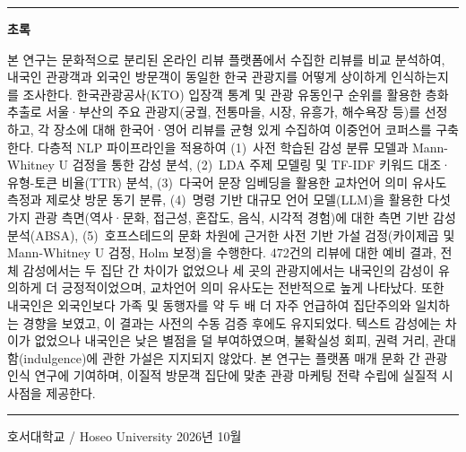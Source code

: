 \documentclass[10pt,a4paper]{article}
\begin{document}
\vspace{8pt}
\noindent\rule{\linewidth}{0.4pt}
\vspace{4pt}

\noindent\textbf{초록}

\vspace{2pt}

\noindent
본 연구는 문화적으로 분리된 온라인 리뷰 플랫폼에서 수집한 리뷰를 비교 분석하여,
내국인 관광객과 외국인 방문객이 동일한 한국 관광지를 어떻게 상이하게 인식하는지를
조사한다. 한국관광공사(KTO) 입장객 통계 및 관광 유동인구 순위를 활용한 층화
추출로 서울·부산의 주요 관광지(궁궐, 전통마을, 시장, 유흥가, 해수욕장 등)를
선정하고, 각 장소에 대해 한국어·영어 리뷰를 균형 있게 수집하여 이중언어
코퍼스를 구축한다. 다층적 NLP 파이프라인을 적용하여 (1)~사전 학습된 감성 분류
모델과 Mann-Whitney U 검정을 통한 감성 분석, (2)~LDA 주제 모델링 및 TF-IDF
키워드 대조·유형-토큰 비율(TTR) 분석, (3)~다국어 문장 임베딩을 활용한
교차언어 의미 유사도 측정과 제로샷 방문 동기 분류, (4)~명령 기반 대규모
언어 모델(LLM)을 활용한 다섯 가지 관광 측면(역사·문화, 접근성, 혼잡도, 음식,
시각적 경험)에 대한 측면 기반 감성 분석(ABSA), (5)~호프스테드의 문화 차원에
근거한 사전 기반 가설 검정(카이제곱 및 Mann-Whitney U 검정, Holm 보정)을
수행한다. 472건의 리뷰에 대한 예비 결과, 전체 감성에서는 두 집단 간 차이가
없었으나 세 곳의 관광지에서는 내국인의 감성이 유의하게 더 긍정적이었으며,
교차언어 의미 유사도는 전반적으로 높게 나타났다. 또한 내국인은 외국인보다
가족 및 동행자를 약 두 배 더 자주 언급하여 집단주의와 일치하는 경향을 보였고,
이 결과는 사전의 수동 검증 후에도 유지되었다. 텍스트 감성에는 차이가 없었으나
내국인은 낮은 별점을 덜 부여하였으며, 불확실성 회피, 권력 거리,
관대함(indulgence)에 관한 가설은 지지되지 않았다.
본 연구는 플랫폼 매개 문화 간 관광
인식 연구에 기여하며, 이질적 방문객 집단에 맞춘 관광 마케팅 전략 수립에
실질적 시사점을 제공한다.

\vspace{6pt}
\noindent\rule{\linewidth}{0.4pt}
\vspace{2pt}

{\small 호서대학교 / Hoseo University \hfill 2026년 10월}
\end{document}
